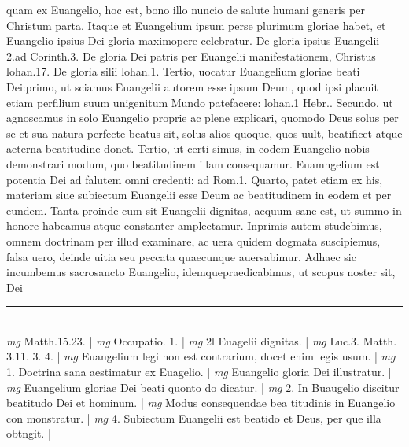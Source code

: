 \documentclass{article}
\begin{document}
\begin{pages}
quam ex Euangelio, hoc est, bono illo nuncio de salute humani generis per Christum parta. Itaque et Euangelium ipsum perse plurimum gloriae habet, et Euangelio ipsius Dei gloria maximopere celebratur. De gloria ipsius Euangelii 2.ad Corinth.3. De gloria Dei patris per Euangelii manifestationem, Christus lohan.17. De gloria silii lohan.1. Tertio, uocatur Euangelium gloriae beati Dei:primo, ut sciamus Euangelii autorem esse ipsum Deum, quod ipsi placuit etiam perfilium suum unigenitum Mundo patefacere: lohan.1 Hebr.. Secundo, ut agnoscamus in solo Euangelio proprie ac plene explicari, quomodo Deus solus per se et sua natura perfecte beatus sit, solus alios quoque, quos uult, beatificet atque aeterna beatitudine donet. Tertio, ut certi simus, in eodem Euangelio nobis demonstrari modum, quo beatitudinem illam consequamur. Euamngelium est potentia Dei ad falutem omni credenti: ad Rom.1. Quarto, patet etiam ex his, materiam siue subiectum Euangelii esse Deum ac beatitudinem in eodem et per eundem. Tanta proinde cum sit Euangelii dignitas, aequum sane est, ut summo in honore habeamus atque constanter amplectamur. Inprimis autem studebimus, omnem doctrinam per illud examinare, ac uera quidem dogmata suscipiemus, falsa uero, deinde uitia seu peccata quaecunque  auersabimur. Adhaec sic incumbemus sacrosancto Euangelio, idemquepraedicabimus, ut scopus noster sit, Dei  \pend
\vspace{0.5cm}\noindent
\vspace{0.2cm}\rule{1cm}{0.2pt}\\ 
\hspace{0.2cm}\textit{mg}
\footnotesize Matth.15.23. 
\normalsize| 
\hspace{0.2cm}\textit{mg}
\footnotesize Occupatio. 1. 
\normalsize| 
\hspace{0.2cm}\textit{mg}
\footnotesize 2l Euagelii dignitas. 
\normalsize| 
\hspace{0.2cm}\textit{mg}
\footnotesize Luc.3. Matth. 3.11. 3. 4. 
\normalsize| 
\hspace{0.2cm}\textit{mg}
\footnotesize Euangelium legi non est contrarium, docet enim legis usum. 
\normalsize| 
\hspace{0.2cm}\textit{mg}
\footnotesize 1. Doctrina sana aestimatur ex Euagelio. 
\normalsize| 
\hspace{0.2cm}\textit{mg}
\footnotesize Euangelio gloria Dei illustratur. 
\normalsize| 
\hspace{0.2cm}\textit{mg}
\footnotesize Euangelium gloriae Dei beati quonto do dicatur. 
\normalsize| 
\hspace{0.2cm}\textit{mg}
\footnotesize 2. In Buaugelio discitur beatitudo Dei et hominum. 
\normalsize| 
\hspace{0.2cm}\textit{mg}
\footnotesize Modus consequendae bea titudinis in Euangelio con monstratur. 
\normalsize| 
\hspace{0.2cm}\textit{mg}
\footnotesize 4. Subiectum Euangelii est beatido et Deus, per que illa obtngit. 
\normalsize| 

\end{pages}
\end{document}
